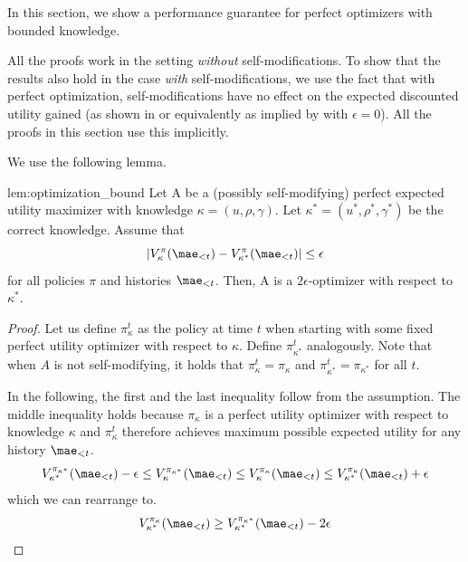 In this section, we show a performance guarantee for perfect optimizers with bounded knowledge.

\begin{remark}
All the proofs work in the setting \textit{without} self-modifications. To show that the results also hold in the case \textit{with} self-modifications, we use the fact that with perfect optimization, self-modifications have no effect on the expected discounted utility gained (as shown in \cite{everitt} or equivalently as implied by  with $\epsilon = 0$). All the proofs in this section use this implicitly.
\end{remark}

We use the following lemma.

\begin{repeatthm}{lem:optimization_bound}
Let A be a (possibly self-modifying) perfect expected utility maximizer with knowledge $\kappa = (u,\rho, \gamma)$. Let $\kappa^* = (u^*,\rho^*, \gamma^*)$ be the correct knowledge. Assume that
\begin{equation} \label{eq:bound_assumption}
|V^\pi_\kappa(\mae_{<t}) - V^\pi_{\kappa^*}(\mae_{<t})| \leq \epsilon
\end{equation}
for all policies $\pi$ and histories $\mae_{<t}$. Then, A is a $2\epsilon$-optimizer with respect to $\kappa^*$.
\end{repeatthm}
\begin{proof}
Let us define $\pi_{\kappa}^t$ as the policy at time $t$ when starting with some fixed perfect utility optimizer with respect to $\kappa$. Define $\pi_{\kappa^*}^t$ analogously. Note that when $A$ is not self-modifying, it holds that $\pi_{\kappa}^t = \pi_{\kappa}$ and $\pi_{\kappa^*}^t = \pi_{\kappa^*}$ for all $t$.

In the following, the first and the last inequality follow from the assumption. The middle inequality holds because $\pi_\kappa$ is a perfect utility optimizer with respect to knowledge $\kappa$ and $\pi_\kappa^t$ therefore achieves maximum possible expected utility for any history $\mae_{<t}$.
\[
V^{\pi_{\kappa^*}}_{\kappa^*}(\mae_{<t}) -\epsilon \leq V^{\pi_{\kappa^*}}_{\kappa}(\mae_{<t}) \leq V^{\pi_{\kappa}}_{\kappa}(\mae_{<t}) \leq V^{\pi_{\kappa}}_{\kappa^*}(\mae_{<t}) + \epsilon
\]
which we can rearrange to.
\[
V^{\pi_{\kappa}}_{\kappa^*}(\mae_{<t}) \geq V^{\pi_{\kappa^*}}_{\kappa^*}(\mae_{<t}) - 2\epsilon
\]
\end{proof}

